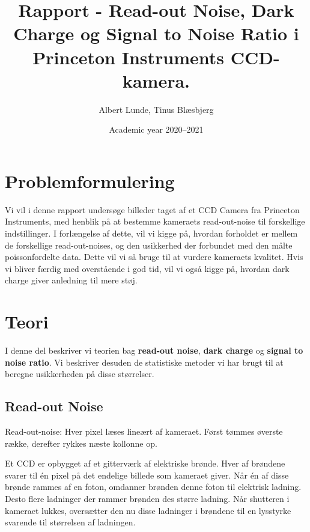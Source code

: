 \documentclass[working]{tuftebook}
\title{Rapport - Read-out Noise, Dark Charge og Signal to Noise Ratio i Princeton Instruments CCD-kamera.}
\author{Albert Lunde, Tinus Blæsbjerg}
\date{Academic year 2020--2021}
\begin{document}
\maketitle
\pagestyle{fancy}
\tableofcontents
\chapter*{Problemformulering}
Vi vil i denne rapport undersøge billeder taget af et CCD Camera fra Princeton Instruments, med henblik på at bestemme kameraets read-out-noise til forskellige indstillinger. I forlængelse af dette, vil vi kigge på, hvordan forholdet er mellem de forskellige read-out-noises, og den usikkerhed der forbundet med den målte poissonfordelte data. Dette vil vi så bruge til at vurdere kameraets kvalitet. Hvis vi bliver færdig med overstående i god tid, vil vi også kigge på, hvordan dark charge giver anledning til mere støj.

\chapter*{Teori}
I denne del beskriver vi teorien bag \textbf{read-out noise}, \textbf{dark charge} og \textbf{signal to noise ratio}. Vi beskriver desuden de statistiske metoder vi har brugt til at beregne usikkerheden på disse størrelser.
\section{Read-out Noise}
\begin{marginfigure}
    \centering
    \caption{Read-out-noise: Hver pixel læses lineært af kameraet. Først tømmes øverste række, derefter rykkes næste kollonne op.}
    \label{fig:read-out-noise}
\end{marginfigure}
Et CCD er opbygget af et gitterværk af elektriske brønde. Hver af brøndene svarer til én pixel på det endelige billede som kameraet giver. Når én af disse brønde rammes af en foton, omdanner brønden denne foton til elektrisk ladning. Desto flere ladninger der rammer brønden des større ladning. Når shutteren i kameraet lukkes, oversætter den nu disse ladninger i brøndene til en lysstyrke svarende til størrelsen af ladningen.
\\
\end{document}
